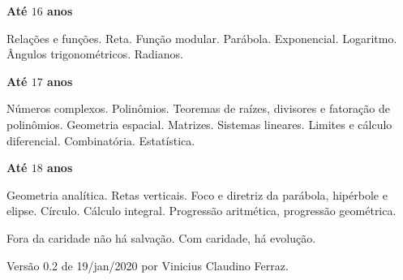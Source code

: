 \documentclass[12pt,a4paper]{article}
\begin{document}
\textbf{At\'e $16$ anos}

Rela\c{c}\~oes e fun\c{c}\~oes. Reta. Fun\c{c}\~ao modular. Par\'abola. Exponencial. Logaritmo. \^Angulos trigonom\'etricos. Radianos.

\vspace{6mm}

\textbf{At\'e $17$ anos}

N\'umeros complexos. Polin\^omios. Teoremas de ra\'izes, divisores e fatora\c{c}\~ao de polin\^omios. Geometria espacial. Matrizes. Sistemas lineares. Limites e c\'alculo diferencial. Combinat\'oria. Estat\'istica.

\vspace{6mm}

\textbf{At\'e $18$ anos}

Geometria anal\'itica. Retas verticais. Foco e diretriz da par\'abola, hip\'erbole e elipse. C\'irculo. C\'alculo integral. Progress\~ao aritm\'etica, progress\~ao geom\'etrica.

\vspace{6mm}

Fora da caridade n\~ao h\'a salva\c{c}\~ao. Com caridade, h\'a evolu\c{c}\~ao.

\vspace{6mm}

Vers\~ao 0.2 de 19/jan/2020 por Vinicius Claudino Ferraz.
\end{document}
